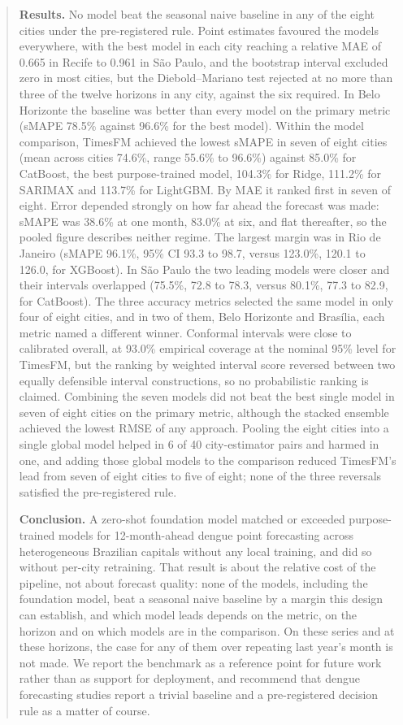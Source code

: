 \documentclass[11pt]{article}
\begin{document}
\begin{abstract}
\noindent\textbf{Results.} No model beat the seasonal naive baseline in any of the eight
cities under the pre-registered rule. Point estimates favoured the models everywhere, with
the best model in each city reaching a relative MAE of 0.665 in Recife to 0.961 in S\~ao
Paulo, and the bootstrap interval excluded zero in most cities, but the Diebold--Mariano
test rejected at no more than three of the twelve horizons in any city, against the six
required. In Belo Horizonte the baseline was better than every model on the primary
metric (sMAPE 78.5\% against 96.6\% for the best model). Within the model comparison,
TimesFM achieved the lowest sMAPE in seven of eight cities
(mean across cities 74.6\%, range 55.6\% to 96.6\%) against 85.0\% for CatBoost, the best
purpose-trained model, 104.3\% for Ridge, 111.2\% for SARIMAX and 113.7\% for LightGBM. By
MAE it ranked first in seven of eight. Error depended strongly on how far ahead the forecast was made: sMAPE was 38.6\% at one month, 83.0\% at six, and flat thereafter, so the pooled figure describes neither regime. The largest margin was in Rio de Janeiro (sMAPE
96.1\%, 95\% CI 93.3 to 98.7, versus 123.0\%, 120.1 to 126.0, for XGBoost). In S\~ao Paulo
the two leading models were closer and their intervals overlapped (75.5\%, 72.8 to 78.3,
versus 80.1\%, 77.3 to 82.9, for CatBoost). The three accuracy metrics selected the same
model in only four of eight cities, and in two of them, Belo Horizonte and Bras\'ilia, each
metric named a different winner. Conformal intervals were close to calibrated overall, at
93.0\% empirical coverage at the nominal 95\% level for TimesFM, but the ranking by
weighted interval score reversed between two equally defensible interval constructions, so
no probabilistic ranking is claimed. Combining the seven models did not beat the best
single model in seven of eight cities on the primary metric, although the stacked ensemble
achieved the lowest RMSE of any approach. Pooling the eight cities into a single global
model helped in 6 of 40 city-estimator pairs and harmed in one, and adding those global
models to the comparison reduced TimesFM's lead from seven of eight cities to five of
eight; none of the three reversals satisfied the pre-registered rule.

\noindent\textbf{Conclusion.} A zero-shot foundation model matched or exceeded
purpose-trained models for 12-month-ahead dengue point forecasting across heterogeneous
Brazilian capitals without any local training, and did so without per-city retraining.
That result is about the relative cost of the pipeline, not about forecast quality: none
of the models, including the foundation model, beat a seasonal naive baseline by a margin
this design can establish, and which model leads depends on the metric, on the horizon and
on which models are in the comparison. On these series and at these horizons, the case for
any of them over repeating last year's month is not made. We report the benchmark as a
reference point for future work rather than as support for deployment, and recommend that
dengue forecasting studies report a trivial baseline and a pre-registered decision rule as
a matter of course.


\end{abstract}
\end{document}
